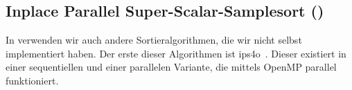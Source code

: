 \subsection{Inplace Parallel Super-Scalar-Samplesort (\ipsviero)}
\label{section:ips4o}

In \sacabench verwenden wir auch andere Sortieralgorithmen, die wir nicht selbst implementiert haben.
Der erste dieser Algorithmen ist ips4o~\cite{axtmann2017}.
Dieser existiert in einer sequentiellen und einer parallelen Variante,
die mittels OpenMP parallel funktioniert.